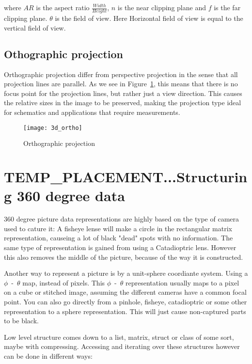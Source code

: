 where $AR$ is the aspect ratio $\frac{Width}{Height}$, $n$ is the near clipping plane and $f$ is the far clipping plane. $\theta$ is the field of view. Here Horizontal field of view is equal to the vertical field of view.


\subsection{Othographic projection}

Orthographic projection differ from perspective projection in the sense that all projection lines are parallel. As we see in Figure~\ref{fig:orthographic_projection}, this means that there is no focus point for the projection lines, but rather just a view direction. This causes the relative sizes in the image to be preserved, making the projection type ideal for schematics and applications that require measurements.

\begin{figure}[!htb]
    \centering
    \texttt{[image: 3d\_ortho]}
    \caption{Orthographic projection}
    \label{fig:orthographic_projection}
\end{figure}




\section{TEMP\_PLACEMENT...Structuring 360 degree data}
360 degree picture data representations are highly based on the type of camera used to cature it: A fisheye lense will make a circle in the rectangular matrix representation, causeing a lot of black "dead" spots with no information. The same type of representation is gained from using a Catadioptric lens. However this also removes the middle of the picture, because of the way it is constructed.

Another way to represent a picture is by a unit-sphere coordiante system. Using a $\phi$~-~$\theta$ map, instead of pixels. This $\phi$~-~$\theta$ representation usually maps to a pixel on a cube or stitched image, assuming the different cameras have a common focal point. You can also go directly from a pinhole, fisheye, catadioptric or some other representation to a sphere representation. This will just cause non-captured parts to be black.

Low level structure comes down to a list, matrix, struct or class of some sort, maybe with compressing. Accessing and iterating over these structures however can be done in different ways: 

